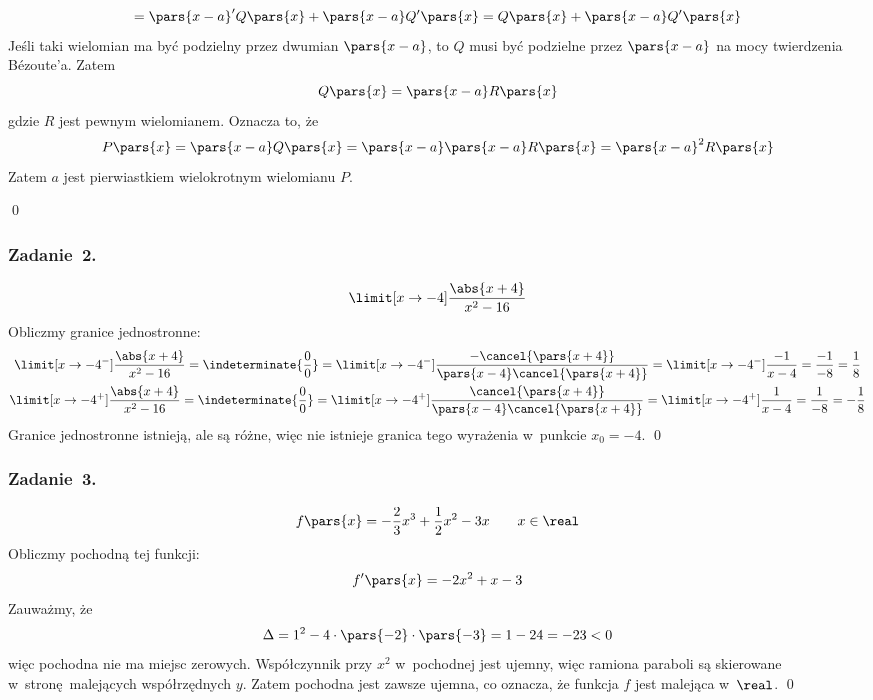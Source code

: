 \begin{proofcases}
\begin{equation*}
                = \pars{x - a}'Q\pars{x} + \pars{x - a}Q'\pars{x}
                = Q\pars{x} + \pars{x - a}Q'\pars{x}
        \end{equation*}
        Jeśli taki wielomian ma być podzielny przez dwumian \(\pars{x - a}\), to \(Q\) musi być podzielne przez \(\pars{x - a}\) na mocy twierdzenia Bézoute'a. Zatem
        \begin{equation*}
            Q\pars{x} = \pars{x - a}R\pars{x}
        \end{equation*}
        gdzie \(R\) jest pewnym wielomianem. Oznacza to, że
        \begin{equation*}
            P\pars{x}
                = \pars{x - a}Q\pars{x}
                = \pars{x - a}\pars{x - a}R\pars{x}
                = \pars{x - a}^2R\pars{x}
        \end{equation*}
        Zatem \(a\) jest pierwiastkiem wielokrotnym wielomianu \(P\).
\end{proofcases}
\qed
\subsubsection*{Zadanie~2.}
\begin{equation*}
    \limit[x \to -4] \frac{\abs{x + 4}}{x^2 - 16}
\end{equation*}
Obliczmy granice jednostronne:
\begin{gather*}
    \limit[x \to -4^-] \frac{\abs{x + 4}}{x^2 - 16}
        = \indeterminate{\frac{0}{0}}
        = \limit[x \to -4^-] \frac{-\cancel{\pars{x + 4}}}{\pars{x - 4}\cancel{\pars{x + 4}}}
        = \limit[x \to -4^-] \frac{-1}{x - 4}
        = \frac{-1}{-8}
        = \frac{1}{8}\\
    \limit[x \to -4^+] \frac{\abs{x + 4}}{x^2 - 16}
        = \indeterminate{\frac{0}{0}}
        = \limit[x \to -4^+] \frac{\cancel{\pars{x + 4}}}{\pars{x - 4}\cancel{\pars{x + 4}}}
        = \limit[x \to -4^+] \frac{1}{x - 4}
        = \frac{1}{-8}
        = -\frac{1}{8}
\end{gather*}
Granice jednostronne istnieją, ale są różne, więc nie istnieje granica tego wyrażenia w~punkcie \(x_0 = -4\).
\qed
\subsubsection*{Zadanie~3.}
\begin{equation*}
    f\pars{x}
        = -\frac{2}{3}x^3 + \frac{1}{2}x^2 - 3x \qquad x \in \real
\end{equation*}
Obliczmy pochodną tej funkcji:
\begin{equation*}
    f'\pars{x}
        = -2x^2 + x - 3
\end{equation*}
Zauważmy, że
\begin{equation*}
    \Delta = 1^2 - 4 \cdot \pars{-2} \cdot \pars{-3}
        = 1 - 24
        = -23
        < 0
\end{equation*}
więc pochodna nie ma miejsc zerowych. Współczynnik przy \(x^2\) w~pochodnej jest ujemny, więc ramiona paraboli są skierowane w~stronę malejących współrzędnych \(y\). Zatem pochodna jest zawsze ujemna, co oznacza, że funkcja \(f\) jest malejąca w~\(\real\).
\qed
